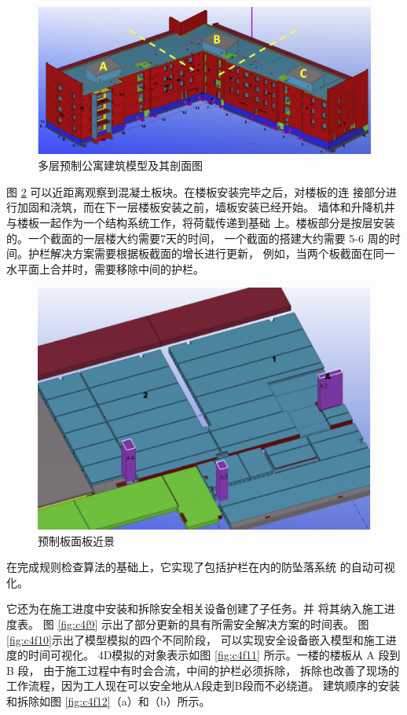 \begin{figure}[thbp!]
    \centering
    \includegraphics[width=1\linewidth]{res/c4f7.png}
    \caption{多层预制公寓建筑模型及其剖面图}
    \label{fig:c4f7}
\end{figure}


图 \ref{fig:c4f8} 可以近距离观察到混凝土板块。在楼板安装完毕之后，对楼板的连
接部分进行加固和浇筑，而在下一层楼板安装之前，墙板安装已经开始。
墙体和升降机井与楼板一起作为一个结构系统工作，将荷载传递到基础
上。楼板部分是按层安装的。一个截面的一层楼大约需要7天的时间，
一个截面的搭建大约需要 5-6 周的时间。护栏解决方案需要根据板截面的增长进行更新，
例如，当两个板截面在同一水平面上合并时，需要移除中间的护栏。

\begin{figure}[thbp!]
    \centering
    \includegraphics[width=0.8\linewidth]{res/c4f8.png}
    \caption{预制板面板近景}
    \label{fig:c4f8}
\end{figure}
\newpage
在完成规则检查算法的基础上，它实现了包括护栏在内的防坠落系统
的自动可视化。

它还为在施工进度中安装和拆除安全相关设备创建了子任务。并
将其纳入施工进度表。
图 \ref{fig:c4f9} 示出了部分更新的具有所需安全解决方案的时间表。
图 \ref{fig:c4f10}示出了模型模拟的四个不同阶段，
可以实现安全设备嵌入模型和施工进度的时间可视化。
4D模拟的对象表示如图 \ref{fig:c4f11} 所示。一楼的楼板从 A 段到 B 段，
由于施工过程中有时会合流，中间的护栏必须拆除，
拆除也改善了现场的工作流程，因为工人现在可以安全地从A段走到B段而不必绕道。
建筑顺序的安装和拆除如图 \ref{fig:c4f12}（a）和（b）所示。

